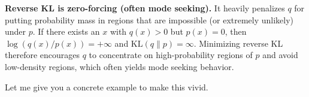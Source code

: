 \vspace{1em}

\textbf{Reverse KL is zero-forcing (often mode seeking).} It heavily penalizes $q$ for putting probability mass in regions that are impossible (or extremely unlikely) under $p$. If there exists an $x$ with $q(x) > 0$ but $p(x) = 0$, then $\log(q(x)/p(x)) = +\infty$ and $\text{KL}(q\|p)=\infty$. Minimizing reverse KL therefore encourages $q$ to concentrate on high-probability regions of $p$ and avoid low-density regions, which often yields mode seeking behavior.

\vspace{2em}

Let me give you a concrete example to make this vivid.

\vspace{1.5em}

